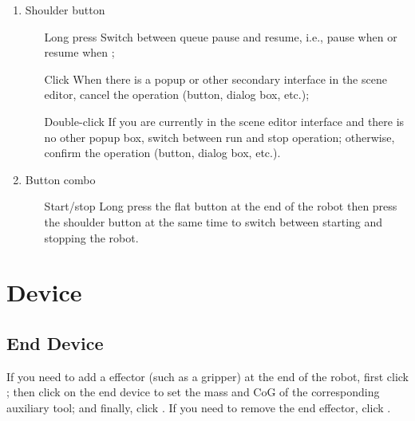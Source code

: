 \begin{enumerate}[label=(\arabic*)]
	\item Shoulder button
	\begin{itemize}
		\item[Long press] Switch between queue pause and resume, i.e., pause when  or resume when ;
		\item[Click] When there is a popup or other secondary interface in the scene editor, cancel the operation (button, dialog box, etc.);
		\item[Double-click] If you are currently in the scene editor interface and there is no other pop­up box, switch between run and stop operation; otherwise, confirm the operation (button, dialog box, etc.).
	\end{itemize}

	\item Button combo
	\begin{itemize}
		\item [Start/stop] Long press the flat button at the end of the robot then press the shoulder button at the same time to switch between starting and stopping the robot.

	\end{itemize}
\end{enumerate}

\section{Device}
\subsection{End Device}
\label{sec:末端设备}
If you need to add a effector (such as a gripper) at the end of the robot, first click ; then click  on the end device to set the mass and CoG of the corresponding auxiliary tool; and finally, click . If you need to remove the end effector, click .


